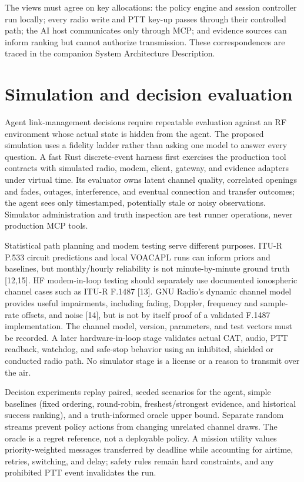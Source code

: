 \documentclass[11pt,a4paper]{article}
\begin{document}
The views must agree on key allocations: the policy engine and session
controller run locally; every radio write and PTT key-up passes through their
controlled path; the AI host communicates only through MCP; and evidence
sources can inform ranking but cannot authorize transmission. These
correspondences are traced in the companion System Architecture Description.

\section{Simulation and decision evaluation}
Agent link-management decisions require repeatable evaluation against an RF
environment whose actual state is hidden from the agent. The proposed
simulation uses a fidelity ladder rather than asking one model to answer every
question. A fast Rust discrete-event harness first exercises the production
tool contracts with simulated radio, modem, client, gateway, and evidence
adapters under virtual time. Its evaluator owns latent channel quality,
correlated openings and fades, outages, interference, and eventual connection
and transfer outcomes; the agent sees only timestamped, potentially stale or
noisy observations. Simulator administration and truth inspection are test
runner operations, never production MCP tools.

Statistical path planning and modem testing serve different purposes.
ITU-R P.533 circuit predictions and local VOACAPL runs can inform priors and
baselines, but monthly/hourly reliability is not minute-by-minute ground truth
[12,15]. HF modem-in-loop testing should separately use documented
ionospheric channel cases such as ITU-R F.1487 [13]. GNU Radio's dynamic
channel model provides useful impairments, including fading, Doppler,
frequency and sample-rate offsets, and noise [14], but is not by itself proof
of a validated F.1487 implementation. The channel model, version, parameters,
and test vectors must be recorded. A later hardware-in-loop stage validates
actual CAT, audio, PTT readback, watchdog, and safe-stop behavior using an
inhibited, shielded or conducted radio path. No simulator stage is a license
or a reason to transmit over the air.

Decision experiments replay paired, seeded scenarios for the agent, simple
baselines (fixed ordering, round-robin, freshest/strongest evidence, and
historical success ranking), and a truth-informed oracle upper bound. Separate
random streams prevent policy actions from changing unrelated channel draws.
The oracle is a regret reference, not a deployable policy. A mission utility
values priority-weighted messages transferred by deadline while accounting
for airtime, retries, switching, and delay; safety rules remain hard
constraints, and any prohibited PTT event invalidates the run.
\end{document}
